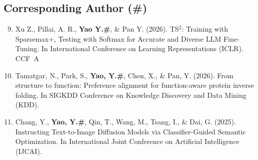 \documentclass[10pt, letterpaper]{article}
\begin{document}
\subsection{Corresponding Author (\#)}
\begin{enumerate}
\setcounter{enumi}{8}
    \item Xu Z., Pillai, A. R., \textbf{Yao Y.\#}, \& Pan Y. (2026). TS$^2$: Training with Sparsemax+, Testing with Softmax for Accurate and Diverse LLM Fine-Tuning. In International Conference on Learning Representations (ICLR). {\color{deeppink}CCF~A}
    \item Tamatgar, N., Park, S., \textbf{Yao, Y.\#}, Chen, X., \& Pan, Y. (2026). From structure to function: Preference alignment for function-aware protein inverse folding. In SIGKDD Conference on Knowledge Discovery and Data Mining (KDD).
    \item Chang, Y., \textbf{Yao, Y.\#}, Qin, T., Wang, M., Tsang, I., \& Dai, G. (2025). Instructing Text-to-Image Diffusion Models via Classifier-Guided Semantic Optimization. In International Joint Conference on Artificial Intelligence (IJCAI). {\color{deeppink}{Accepted as CCF A}}
    
\end{enumerate}
\end{document}
